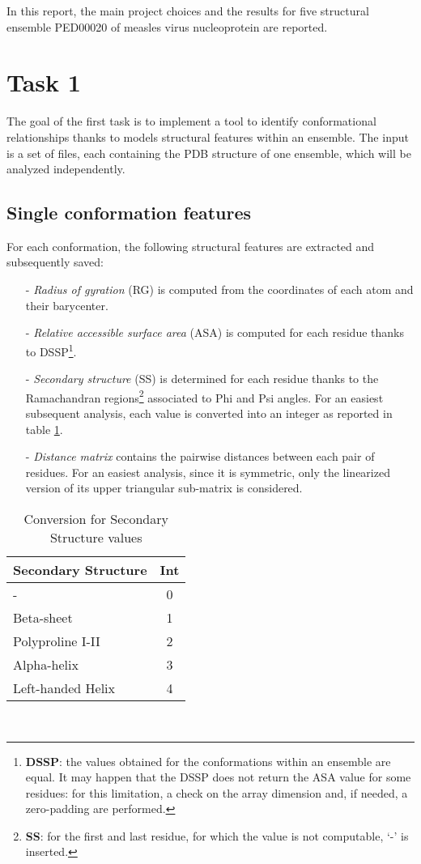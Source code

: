 

\noindent In this report, the main project choices and the results for five structural ensemble PED00020 of measles virus nucleoprotein are reported.

\section{Task 1}\label{sec:task1}
\graphicspath{ {./figures/} }

The goal of the first task is to implement a tool to identify conformational relationships thanks to models structural features within an ensemble. The input is a set of files, each containing the PDB structure of one ensemble, which will be analyzed independently.

\subsection{Single conformation features}

For each conformation, the following structural features are extracted and subsequently saved:
\begin{itemize}
\item[-] \emph{Radius of gyration} (RG) is computed from the coordinates of each atom and their barycenter.
\item[-] \emph{Relative accessible surface area} (ASA) is computed for each residue thanks to DSSP\footnote{\textbf{DSSP}: the values obtained for the conformations within an ensemble are equal. It may happen that the DSSP does not return the ASA value for some residues: for this limitation, a check on the array dimension and, if needed, a zero-padding are performed. }.
\item[-] \emph{Secondary structure} (SS) is determined for each residue thanks to the Ramachandran regions\footnote{\textbf{SS}: for the first and last residue, for which the value is not computable, `-' is inserted.} associated to Phi and Psi angles. For an easiest subsequent analysis, each value is converted into an integer as reported in table \ref{tab:ss}.
\item[-] \emph{Distance matrix} contains the pairwise distances between each pair of residues. For an easiest analysis, since it is symmetric, only the linearized version of its upper triangular sub-matrix is considered.
\end{itemize}

\begin{table}[H]
\begin{center}
\begin{tabular}{lc}
\textbf{Secondary Structure} & \textbf{Int}\\
\hline
- & 0\\
\hline
Beta-sheet & 1\\
\hline
Polyproline I-II & 2\\
\hline
Alpha-helix & 3\\
\hline
Left-handed Helix & 4\\
\end{tabular}
\end{center}
\caption{Conversion for Secondary Structure values}~\label{tab:ss}
\end{table}



